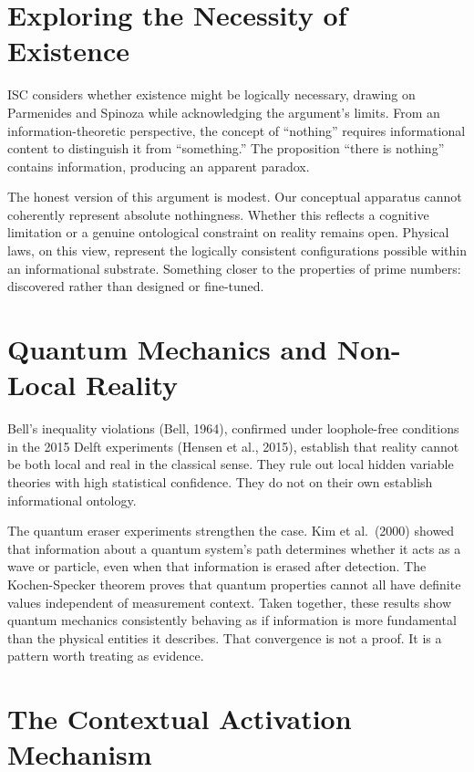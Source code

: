 \documentclass[12pt]{article}
\begin{document}
\section{Exploring the Necessity of
Existence}\label{exploring-the-necessity-of-existence}

ISC considers whether existence might be logically necessary, drawing on
Parmenides and Spinoza while acknowledging the argument's limits. From
an information-theoretic perspective, the concept of ``nothing''
requires informational content to distinguish it from ``something.'' The
proposition ``there is nothing'' contains information, producing an
apparent paradox.

The honest version of this argument is modest. Our conceptual apparatus
cannot coherently represent absolute nothingness. Whether this reflects
a cognitive limitation or a genuine ontological constraint on reality
remains open. Physical laws, on this view, represent the logically
consistent configurations possible within an informational substrate.
Something closer to the properties of prime numbers: discovered rather
than designed or fine-tuned.

\section{Quantum Mechanics and Non-Local
Reality}\label{quantum-mechanics-and-non-local-reality}

Bell's inequality violations (Bell, 1964), confirmed under loophole-free
conditions in the 2015 Delft experiments (Hensen et al., 2015),
establish that reality cannot be both local and real in the classical
sense. They rule out local hidden variable theories with high
statistical confidence. They do not on their own establish informational
ontology.

The quantum eraser experiments strengthen the case. Kim et al.~(2000)
showed that information about a quantum system's path determines whether
it acts as a wave or particle, even when that information is erased
after detection. The Kochen-Specker theorem proves that quantum
properties cannot all have definite values independent of measurement
context. Taken together, these results show quantum mechanics
consistently behaving as if information is more fundamental than the
physical entities it describes. That convergence is not a proof. It is a
pattern worth treating as evidence.

\bigskip

\section{The Contextual Activation
Mechanism}\label{the-contextual-activation-mechanism}
\end{document}
